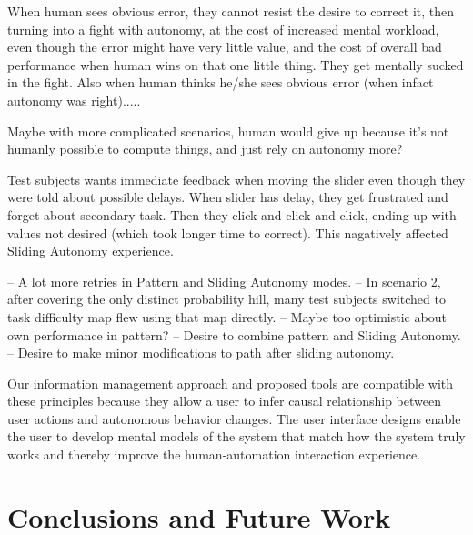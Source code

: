 \documentclass[journal]{IEEEtran}
\begin{document}
When human sees obvious error, they cannot resist the desire to correct it, then turning into a fight with autonomy, at the cost of increased mental workload, even though the error might have very little value, and the cost of overall bad performance when human wins on that one little thing. They get mentally sucked in the fight. Also when human thinks he/she sees obvious error (when infact autonomy was right).....

Maybe with more complicated scenarios, human would give up because it's not humanly possible to compute things, and just rely on autonomy more?

Test subjects wants immediate feedback when moving the slider even though they were told about possible delays. When slider has delay, they get frustrated and forget about secondary task. Then they click and click and click, ending up with values not desired (which took longer time to correct). This nagatively affected Sliding Autonomy experience.


-- A lot more retries in Pattern and Sliding Autonomy modes.
-- In scenario 2, after covering the only distinct probability hill, many test subjects switched to task difficulty map flew using that map directly.
-- Maybe too optimistic about own performance in pattern?
-- Desire to combine pattern and Sliding Autonomy.
-- Desire to make minor modifications to path after sliding autonomy.

Our information management approach and proposed tools are compatible with these principles because they allow a user to infer causal relationship between user actions and autonomous behavior changes. The user interface designs enable the user to develop mental models of the system that match how the system truly works and thereby improve the human-automation interaction experience.




\section{Conclusions and Future Work} 
\label{sec:Conclusions6}
\end{document}

